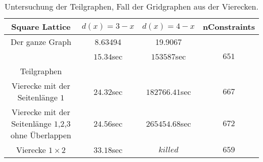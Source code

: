 \documentclass[
	fontsize=12pt,
	paper=a4,
	twoside=false,
	numbers=noenddot,
	plainheadsepline,
	toc=listof,
	toc=bibliography
]{scrartcl}
\begin{document}
	
\begin{table}[htbp]
\centering
\begin{tabular}{|c|c|c|c|}
	\hline
	 
	 Square Lattice       & $d(x)=3-x$  & $d(x)=4-x$   & nConstraints  \\ \hline 
	 Der ganze Graph	   & 8.63494	 & 19.9067      &               \\ 
			              & $15.34$sec	 & $153587$sec  & $651$\\ \hline
			              
	Teilgraphen & & &\\ \hline
	Vierecke mit der Seitenlänge $1$                         & $24.32$sec	& $182766.41$sec & $667$\\ \hline
	Vierecke mit der Seitenlänge $1$,$2$,$3$ ohne Überlappen & $24.56$sec   & $265454.68$sec & $672$\\ \hline
	Vierecke $1\times 2$                                     & $33.18$sec   & $killed$       & $659$\\ \hline

\end{tabular}
\caption{Untersuchung der Teilgraphen, Fall der Gridgraphen aus der Vierecken.} 
\label{Table:TG3}
\end{table}
	
\end{document}
